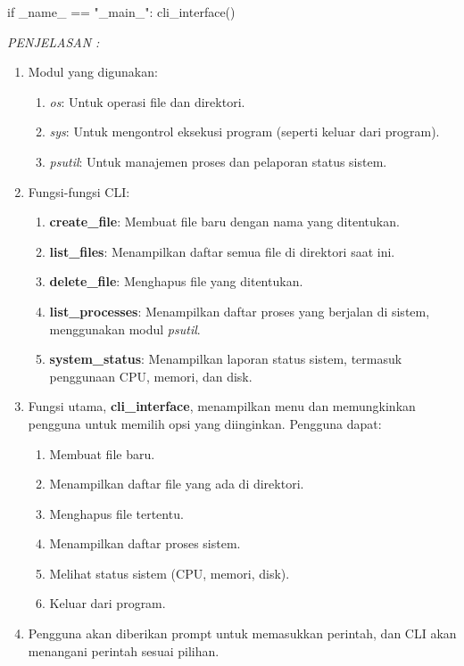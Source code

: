 \documentclass[12pt]{article}
\begin{document}
\begin{enumerate}
\begin{python}
if _name_ == "_main_":
    cli_interface()
\end{python}

\textit{PENJELASAN : }
\begin{enumerate}
    \item Modul yang digunakan:
        \begin{enumerate}
            \item \textit{os}: Untuk operasi file dan direktori.
            \item \textit{sys}: Untuk mengontrol eksekusi program (seperti keluar dari program).
            \item \textit{psutil}: Untuk manajemen proses dan pelaporan status sistem.
        \end{enumerate}
    \item Fungsi-fungsi CLI:
        \begin{enumerate}
            \item \textbf{create\_file}: Membuat file baru dengan nama yang ditentukan.
            \item \textbf{list\_files}: Menampilkan daftar semua file di direktori saat ini.
            \item \textbf{delete\_file}: Menghapus file yang ditentukan.
            \item \textbf{list\_processes}: Menampilkan daftar proses yang berjalan di sistem, menggunakan modul \textit{psutil}.
            \item \textbf{system\_status}: Menampilkan laporan status sistem, termasuk penggunaan CPU, memori, dan disk.
        \end{enumerate}
    \item Fungsi utama, \textbf{cli\_interface}, menampilkan menu dan memungkinkan pengguna untuk memilih opsi yang diinginkan. Pengguna dapat:
        \begin{enumerate}
            \item Membuat file baru.
            \item Menampilkan daftar file yang ada di direktori.
            \item Menghapus file tertentu.
            \item Menampilkan daftar proses sistem.
            \item Melihat status sistem (CPU, memori, disk).
            \item Keluar dari program.
        \end{enumerate}
    \item Pengguna akan diberikan prompt untuk memasukkan perintah, dan CLI akan menangani perintah sesuai pilihan.
\end{enumerate}
\end{enumerate}
\end{document}
